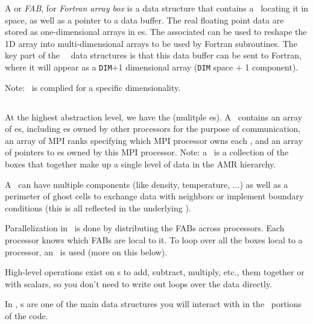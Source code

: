 A \code{\farraybox} or {\em FAB}, for {\em Fortran array box} is a data
structure that contains a \bbox\ locating it in space, as well as a
pointer to a data buffer.  The real floating point data are stored as
one-dimensional arrays in \farraybox es.  The associated \bbox can be
used to reshape the 1D array into multi-dimensional arrays to be used
by Fortran subroutines.  The key part of the \cpp\ \boxlib\ data
structures is that this data buffer can be sent to Fortran, where it
will appear as a {\tt DIM}+1 dimensional array ({\tt DIM} space + 1
component).

Note: \castro\ is complied for a specific dimensionality.


\subsection{\multifab}

At the highest abstraction level, we have the \code{\multifab} (mulitple
\farraybox es).  A \multifab\ contains an array of \bbox es, including
\bbox es owned by other processors for the purpose of communication,
an array of MPI ranks specifying which MPI processor owns each \bbox,
and an array of pointers to \farraybox es owned by this MPI
processor.   Note: a
\multifab\ is a collection of the boxes that together make up a single
level of data in the AMR hierarchy.

A \multifab\ can have multiple components (like density, temperature,
...) as well as a perimeter of ghost cells to exchange data with
neighbors or implement boundary conditions (this is all reflected in
the underlying \farraybox).

Parallelization in \boxlib\ is done by distributing the FABs across
processors.  Each processor knows which FABs are local to it.  To loop
over all the boxes local to a processor, an \mfiter\ is used (more
on this below).

High-level operations exist on \multifab s to add, subtract, multiply,
etc., them together or with scalars, so you don't need to write out
loops over the data directly.

In \castro, \multifab s are one of the main data structures you will
interact with in the \cpp\ portions of the code.


\subsection{\statedata}

